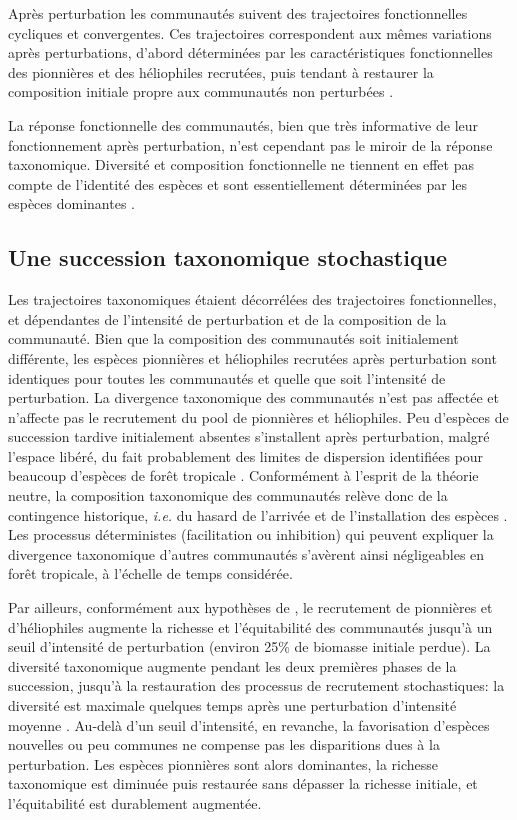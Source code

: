 \documentclass[
  11pt,
  french,
  A4paper,
  extrafontsizes,onecolumn,openright
  ]{memoir}
\begin{document}
Après perturbation les communautés suivent des trajectoires
fonctionnelles cycliques et convergentes. Ces trajectoires correspondent
aux mêmes variations après perturbations, d'abord déterminées par les
caractéristiques fonctionnelles des pionnières et des héliophiles
recrutées, puis tendant à restaurer la composition initiale propre aux
communautés non perturbées \autocite{Buzzard2016}.

La réponse fonctionnelle des communautés, bien que très informative de
leur fonctionnement après perturbation, n'est cependant pas le miroir de
la réponse taxonomique. Diversité et composition fonctionnelle ne
tiennent en effet pas compte de l'identité des espèces et sont
essentiellement déterminées par les espèces dominantes
\autocites{Grime1998}{Lavorel2002}.

\subsection{Une succession taxonomique
stochastique}\label{une-succession-taxonomique-stochastique}

Les trajectoires taxonomiques étaient décorrélées des trajectoires
fonctionnelles, et dépendantes de l'intensité de perturbation et de la
composition de la communauté. Bien que la composition des communautés
soit initialement différente, les espèces pionnières et héliophiles
recrutées après perturbation sont identiques pour toutes les communautés
et quelle que soit l'intensité de perturbation. La divergence
taxonomique des communautés n'est pas affectée et n'affecte pas le
recrutement du pool de pionnières et héliophiles. Peu d'espèces de
succession tardive initialement absentes s'installent après
perturbation, malgré l'espace libéré, du fait probablement des limites
de dispersion identifiées pour beaucoup d'espèces de forêt tropicale
\autocite{Svenning2005}. Conformément à l'esprit de la théorie neutre,
la composition taxonomique des communautés relève donc de la contingence
historique, \emph{i.e.} du hasard de l'arrivée et de l'installation des
espèces \autocite{Hubbell2001}. Les processus déterministes
(facilitation ou inhibition) qui peuvent expliquer la divergence
taxonomique d'autres communautés \autocite{Fukami2005} s'avèrent ainsi
négligeables en forêt tropicale, à l'échelle de temps considérée.

Par ailleurs, conformément aux hypothèses de \textcite{Connell1978}, le
recrutement de pionnières et d'héliophiles augmente la richesse et
l'équitabilité des communautés jusqu'à un seuil d'intensité de
perturbation (environ 25\% de biomasse initiale perdue). La diversité
taxonomique augmente pendant les deux premières phases de la succession,
jusqu'à la restauration des processus de recrutement stochastiques: la
diversité est maximale quelques temps après une perturbation d'intensité
moyenne \autocites{Molino2001}{Guitet2018}. Au-delà d'un seuil
d'intensité, en revanche, la favorisation d'espèces nouvelles ou peu
communes ne compense pas les disparitions dues à la perturbation. Les
espèces pionnières sont alors dominantes, la richesse taxonomique est
diminuée puis restaurée sans dépasser la richesse initiale, et
l'équitabilité est durablement augmentée.
\end{document}
